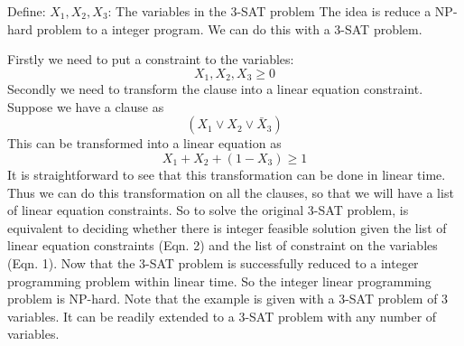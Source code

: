 \documentclass[11pt]{article}
\begin{document}

\noindent Define:\newline
\noindent $X_1,X_2,X_3$: The variables in the 3-SAT problem\newline
\noindent The idea is reduce a NP-hard problem to a integer program. We can do this with a 3-SAT problem. \newline

\vspace{10mm}

\noindent Firstly we need to put a constraint to the variables: 
\begin{equation}
X_1,X_2,X_3 \geq 0
\end{equation}
Secondly we need to transform the clause into a linear equation constraint. Suppose we have a clause as 
\[
(X_1 \vee X_2 \vee \bar{X}_3)
\]
This can be transformed into a linear equation as 
\begin{equation}
X_1+X_2+(1-X_3)\geq 1
\end{equation}
It is straightforward to see that this transformation can be done in linear time. Thus we can do this transformation on all the clauses, so that we will have a list of linear equation constraints.  So to solve the original 3-SAT problem, is equivalent to deciding whether there is integer feasible solution given the list of linear equation constraints (Eqn. 2) and the list of constraint on the variables (Eqn. 1).  Now that the 3-SAT problem is successfully reduced to a integer programming problem within linear time. So the integer linear programming problem is NP-hard.\newline
\noindent Note that the example is given with a 3-SAT problem of 3 variables. It can be readily extended to a 3-SAT problem with any number of variables. 
\end{document}
